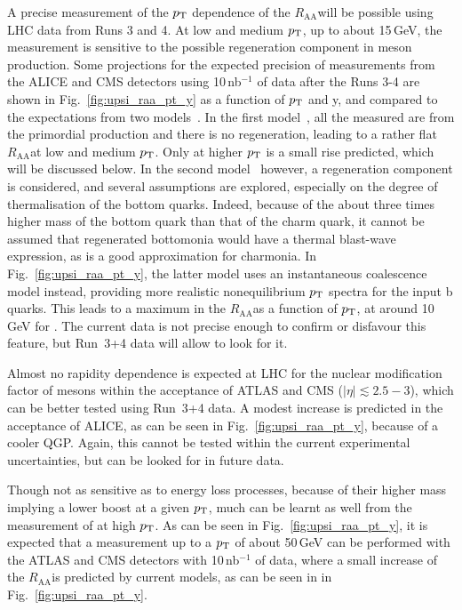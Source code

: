 \documentclass[../report.tex]{subfiles}
\providecommand{\pt}{\ensuremath{p_\text{T}}\Xspace}
\providecommand{\raa}{\ensuremath{R_\text{AA}}\Xspace}
\begin{document}
A precise measurement of the $\pt$ dependence of the  \raa will be possible using LHC data from Runs 3 and 4. At low and medium $\pt$, up to about 15\,GeV, the measurement is
sensitive to the possible regeneration component in \PGU meson production. Some projections for the expected precision of \PGU measurements from the ALICE and CMS detectors
using 10\,nb$^{-1}$ of data after the Runs 3-4 are shown in Fig.~\ref{fig:upsi_raa_pt_y} as a function of $\pt$ and y, and compared to the expectations from two 
models~\cite{Krouppa:2017jlg,Du:2017qkv}. In the first model~\cite{Krouppa:2017jlg}, all the measured \PGU are from the primordial production and there is no regeneration, leading
to a rather flat \raa at low and medium $\pt$. Only at higher $\pt$ is a small rise predicted, which will be discussed below. In the second model~\cite{Du:2017qkv} however, a regeneration
component is considered, and several assumptions are explored, especially on the degree of thermalisation of the bottom quarks. Indeed, because of the about three times higher mass of
the bottom quark than that of the charm quark, it cannot be assumed that regenerated bottomonia would have a thermal blast-wave expression, as is a good approximation for charmonia.
In Fig.~\ref{fig:upsi_raa_pt_y}, the latter model uses an instantaneous coalescence model instead, providing more realistic nonequilibrium $\pt$ spectra for the input b quarks. 
This leads to a maximum in the \raa as a function of $\pt$, at around 10\,GeV for . The current data is not precise enough to confirm or disfavour this feature, but Run~3+4 
data will allow to look for it.

Almost no rapidity dependence is expected at LHC for the nuclear modification factor of \PGU mesons within the acceptance of ATLAS and CMS ($|\eta|\lesssim 2.5-3$), which can be better
tested using Run~3+4 data. A modest increase is predicted in the acceptance of ALICE, as can be seen in Fig.~\ref{fig:upsi_raa_pt_y}, because of a cooler QGP. Again, this cannot be tested
within the current experimental uncertainties, but can be looked for in future data.

Though not as sensitive as \PJgy to energy loss processes, because of their higher mass implying a lower boost at a given $\pt$, much can be learnt as well from the measurement of
 at high $\pt$. As can be seen in Fig.~\ref{fig:upsi_raa_pt_y}, it is expected that a measurement up to a $\pt$ of about 50\,GeV can be performed with the ATLAS and CMS detectors with
10\,nb$^{-1}$ of data, where a small increase of the \raa is predicted by current models, as can be seen in in Fig.~\ref{fig:upsi_raa_pt_y}.
\end{document}

